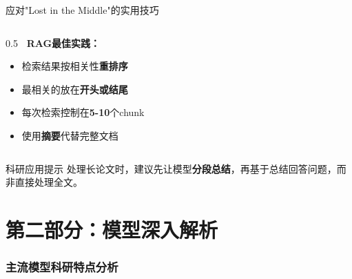 \documentclass[aspectratio=169,11pt]{beamer}
\begin{document}
\begin{frame}{应对"Lost in the Middle"的实用技巧}
\begin{columns}
\begin{column}{0.5\textwidth}
            \vspace{0.3cm}
            \textbf{\faLightbulb\ RAG最佳实践：}
            \begin{itemize}
                \item 检索结果按相关性\textbf{重排序}
                \item 最相关的放在\textbf{开头或结尾}
                \item 每次检索控制在\textbf{5-10}个chunk
                \item 使用\textbf{摘要}代替完整文档
            \end{itemize}
        \end{column}
    \end{columns}
    
    \vspace{0.3cm}
    \begin{block}{科研应用提示}
        \centering
        处理长论文时，建议先让模型\textbf{分段总结}，再基于总结回答问题，而非直接处理全文。
    \end{block}
\end{frame}

\part{第二部分：模型深入解析}

\section{主流模型科研特点分析}
\end{document}
